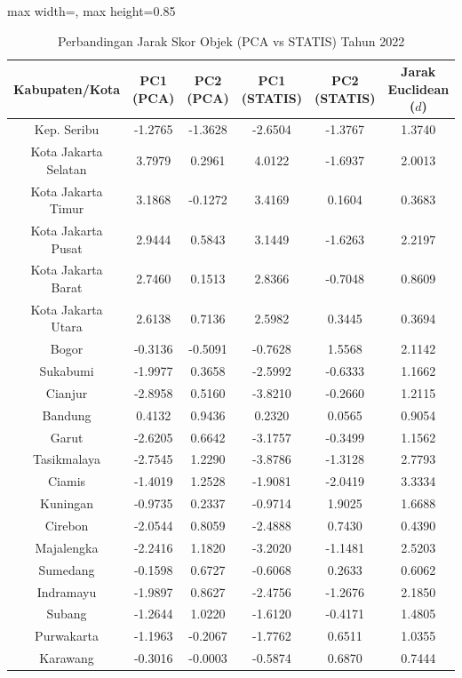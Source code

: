 \begin{table}[H]
\centering
\caption{Perbandingan Jarak Skor Objek (PCA vs STATIS) Tahun 2022} \label{tab:appjarak_skor_2022}
\begin{adjustbox}{max width=\textwidth, max height=0.85\textheight}
\begin{tabular}{|c|c|c|c|c|c|}
\hline
\textbf{Kabupaten/Kota} & \textbf{PC1 (PCA)} & \textbf{PC2 (PCA)} & \textbf{PC1 (STATIS)} & \textbf{PC2 (STATIS)} & \textbf{Jarak Euclidean ($d$)} \\
\hline
Kep. Seribu & -1.2765 & -1.3628 & -2.6504 & -1.3767 & 1.3740 \\
Kota Jakarta Selatan & 3.7979 & 0.2961 & 4.0122 & -1.6937 & 2.0013 \\
Kota Jakarta Timur & 3.1868 & -0.1272 & 3.4169 & 0.1604 & 0.3683 \\
Kota Jakarta Pusat & 2.9444 & 0.5843 & 3.1449 & -1.6263 & 2.2197 \\
Kota Jakarta Barat & 2.7460 & 0.1513 & 2.8366 & -0.7048 & 0.8609 \\
Kota Jakarta Utara & 2.6138 & 0.7136 & 2.5982 & 0.3445 & 0.3694 \\
Bogor & -0.3136 & -0.5091 & -0.7628 & 1.5568 & 2.1142 \\
Sukabumi & -1.9977 & 0.3658 & -2.5992 & -0.6333 & 1.1662 \\
Cianjur & -2.8958 & 0.5160 & -3.8210 & -0.2660 & 1.2115 \\
Bandung & 0.4132 & 0.9436 & 0.2320 & 0.0565 & 0.9054 \\
Garut & -2.6205 & 0.6642 & -3.1757 & -0.3499 & 1.1562 \\
Tasikmalaya & -2.7545 & 1.2290 & -3.8786 & -1.3128 & 2.7793 \\
Ciamis & -1.4019 & 1.2528 & -1.9081 & -2.0419 & 3.3334 \\
Kuningan & -0.9735 & 0.2337 & -0.9714 & 1.9025 & 1.6688 \\
Cirebon & -2.0544 & 0.8059 & -2.4888 & 0.7430 & 0.4390 \\
Majalengka & -2.2416 & 1.1820 & -3.2020 & -1.1481 & 2.5203 \\
Sumedang & -0.1598 & 0.6727 & -0.6068 & 0.2633 & 0.6062 \\
Indramayu & -1.9897 & 0.8627 & -2.4756 & -1.2676 & 2.1850 \\
Subang & -1.2644 & 1.0220 & -1.6120 & -0.4171 & 1.4805 \\
Purwakarta & -1.1963 & -0.2067 & -1.7762 & 0.6511 & 1.0355 \\
Karawang & -0.3016 & -0.0003 & -0.5874 & 0.6870 & 0.7444 \\

\end{tabular}
\end{adjustbox}
\end{table}
